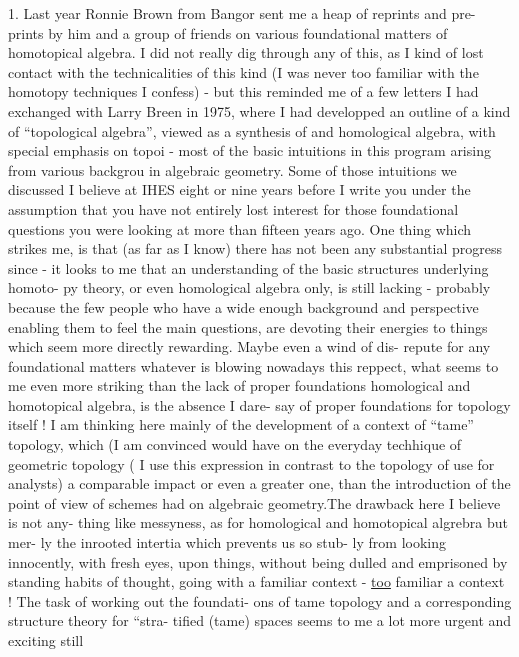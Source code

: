\hand{\S} 1. Last year Ronnie Brown from Bangor sent me a heap of reprints and pre-%
prints by him and a group of friends\hand{,} on various foundational matters of
homotopical algebra. I did not really dig through any of this, as I kind of
lost contact with the technicalities of this kind (I was never too familiar
with the homotopy techniques\hand{/} I confess) - but this reminded me of a few
letters I had exchanged with Larry Breen in 1975, where I had developped
an outline of a  kind of ``topological algebra'', viewed as a synthesis of
 and homological algebra, with special emphasis on topoi -
most of the basic intuitions in this program arising from various backgrou
in algebraic geometry. \hand{\unsure{(}}Some of those intuitions we discussed\hand{,} I believe\hand{,}
at IHES eight or nine years before\hand{,}  \hand{/} I write you under the assumption that you have not
entirely lost interest for those foundational questions you were looking at
more than fifteen years ago. One thing which strikes me, is that (as far
as I know) there has not been any substantial progress since - it looks
to me that an understanding of the basic structures underlying homoto-%
py theory, or even homological algebra only, is still lacking - probably
because the few people who have a wide enough background and perspective
enabling them to feel the main questions, are devoting their energies to
things which seem more directly rewarding. Maybe  even a wind of dis-%
repute for any foundational matters whatever is blowing nowadays \xout{\unsure{!}}
this reppect, what seems to me even more striking than the lack of proper
foundations  homological and homotopical algebra, is the absence I dare-%
say of proper foundations for topology itself ! I am thinking here mainly
of the development of a context of ``tame'' topology, which (I am convinced\hand{)}
would have on the everyday techhique of geometric topology ( I use this
expression in contrast to the topology of use for analysts) a comparable
impact or even a greater one, than the introduction of the point of view of
schemes had on algebraic geometry.The  drawback here I believe is not any-%
thing like messyness, as for homological and homotopical algrebra\hand{,} but mer-%
\margin{-}ly the inrooted intertia which  prevents  us so stub-%
ly from looking innocently, with fresh eyes, upon things, without being
dulled and emprisoned by standing habits of thought, going with a familiar
context - \uline{too} familiar a context ! The task of working out the foundati-%
ons of tame topology\hand{,} and a  corresponding structure theory for ``stra-%
tified (tame) spaces\hand{,} seems to me a lot more urgent and exciting still  

